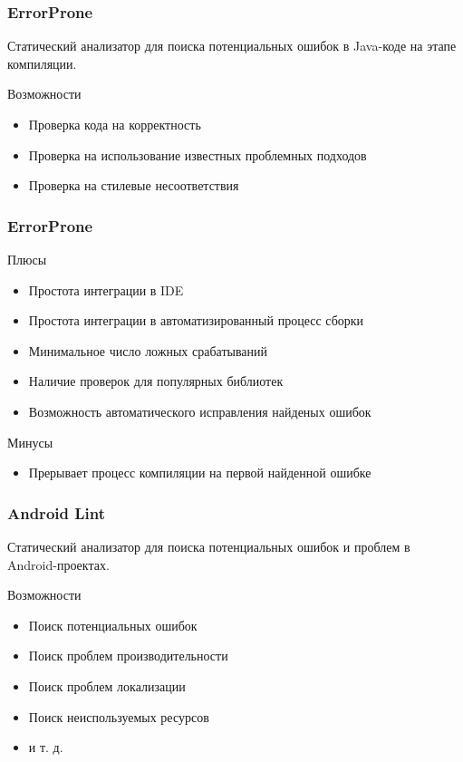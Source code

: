 \documentclass{beamer}
\begin{document}
\begin{frame}
    \frametitle{ErrorProne}
    Статический анализатор для поиска потенциальных ошибок в Java-коде на этапе
    компиляции.
    \begin{block}{Возможности}
        \begin{itemize}
            \item{Проверка кода на корректность}
            \item{Проверка на использование известных проблемных подходов}
            \item{Проверка на стилевые несоответствия}
        \end{itemize}
    \end{block}
\end{frame}

\begin{frame}
    \frametitle{ErrorProne}
    \begin{block}{Плюсы}
        \begin{itemize}
            \item{Простота интеграции в IDE}
            \item{Простота интеграции в автоматизированный процесс сборки}
            \item{Минимальное число ложных срабатываний}
            \item{Наличие проверок для популярных библиотек}
            \item{Возможность автоматического исправления найденых ошибок}
        \end{itemize}
    \end{block}
    \begin{block}{Минусы}
        \begin{itemize}
            \item{Прерывает процесс компиляции на первой найденной ошибке}
        \end{itemize}
    \end{block}
\end{frame}

\begin{frame}
    \frametitle{Android Lint}
    Статический анализатор для поиска потенциальных ошибок и проблем в Android-проектах.
    \begin{block}{Возможности}
        \begin{itemize}
            \item{Поиск потенциальных ошибок}
            \item{Поиск проблем производительности}
            \item{Поиск проблем  локализации}
            \item{Поиск неиспользуемых ресурсов}
            \item{и т. д.}
        \end{itemize}
    \end{block}
\end{frame}
\end{document}
